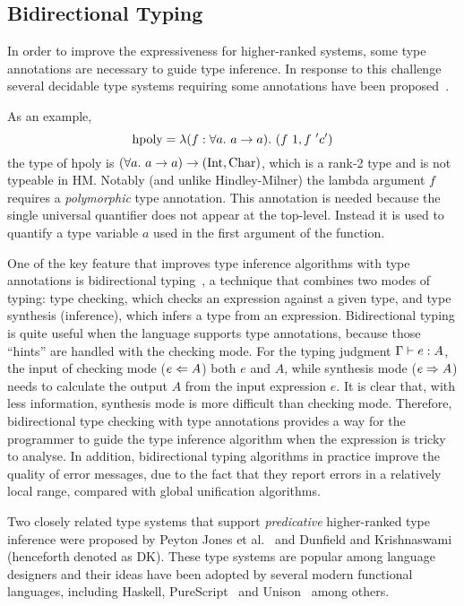 \subsection{Bidirectional Typing}

In order to improve the expressiveness for higher-ranked systems,
some type annotations are necessary to guide type inference.
In response to this challenge several decidable type systems requiring some annotations 
have been proposed~\cite{dunfield2013complete,
jones2007practical,Serrano2018,le2003ml,leijen2008hmf,vytiniotis2008fph}.

As an example,
$$\text{hpoly} = \lam[(f:\all a \to a)] (f~1, f~'c')$$
the type of $\text{hpoly}$ is $(\all a \to a) \to (\text{Int}, \text{Char})$,
which is a rank-2 type and is not typeable in HM.
Notably (and unlike Hindley-Milner) the lambda argument $f$ requires a
\emph{polymorphic} type annotation.
This annotation is needed because the single universal quantifier
does not appear at the top-level. Instead it is used to quantify a
type variable $a$ used in the first argument of the function.

One of the key feature that improves type inference algorithms with type annotations
is bidirectional typing~\citep{pierce:local}, a technique that combines two modes of typing:
type checking, which checks an expression against a given type,
and type synthesis (inference), which infers a type from an expression.
Bidirectional typing is quite useful when the language supports type annotations,
because those ``hints'' are handled with the checking mode.
For the typing judgment $\Gamma \vdash e : A$,
the input of checking mode ($e \Leftarrow A$) both $e$ and $A$,
while synthesis mode ($e \Rightarrow A$)
needs to calculate the output $A$ from the input expression $e$.
It is clear that, with less information,
synthesis mode is more difficult than checking mode.
Therefore, bidirectional type checking with type annotations
provides a way for the programmer to guide
the type inference algorithm when the expression is tricky to analyse.
In addition, bidirectional typing algorithms in practice improve the quality of error messages,
due to the fact that they report errors in a relatively local range,
compared with global unification algorithms.

Two closely related type systems that 
support \emph{predicative} higher-ranked type inference were proposed 
by Peyton Jones et al.~\citep{jones2007practical} and Dunfield and
Krishnaswami~\citep{dunfield2013complete} (henceforth denoted as DK). 
These type systems are
popular among language designers and their ideas have been adopted by
several modern functional languages, including Haskell, PureScript~\citep{PureScript} and
Unison~\citep{Unison} among others.

